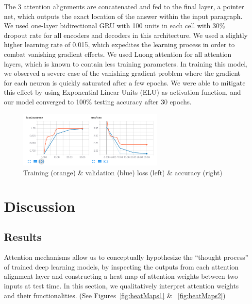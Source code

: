 \documentclass{article}
\begin{document}
The 3 attention alignments are concatenated and fed to the final layer, a pointer net, which outputs the exact location of the answer within the input paragraph. We used one-layer bidirectional GRU with 100 units in each cell with 30\% dropout rate for all encoders and decoders in this architecture. We used a slightly higher learning rate of 0.015, which expedites the learning process in order to combat vanishing gradient effects. We used Luong attention \cite{Luong} for all attention layers, which is known to contain less training parameters. In training this model, we observed a severe case of the vanishing gradient problem where the gradient for each neuron is quickly saturated after a few epochs. We were able to mitigate this effect by using Exponential Linear Units (ELU) \cite{ELU} as activation function, and our model converged to 100\% testing accuracy after 30 epochs.

\begin{figure}[h]
	\includegraphics[width=0.65\textwidth]{training.png}
	\centering
	\caption{Training (orange) \& validation (blue) loss (left) \& accuracy (right)}
\end{figure}

\section{Discussion} \label{discussion}

\subsection{Results}
Attention mechanisms allow us to conceptually hypothesize the ``thought process'' of trained deep learning models, by inspecting the outputs from each attention alignment layer and constructing a heat map of attention weights between two inputs at test time. In this section, we qualitatively interpret attention weights and their functionalities. (See Figures~\ref{fig:heatMaps1} \& ~\ref{fig:heatMaps2})
\end{document}
